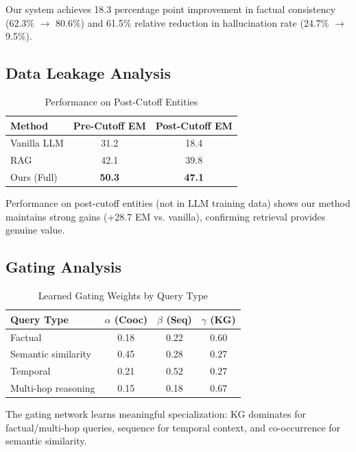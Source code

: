 \documentclass[conference]{IEEEtran}
\begin{document}
Our system achieves 18.3 percentage point improvement in factual consistency (62.3\% $\rightarrow$ 80.6\%) and 61.5\% relative reduction in hallucination rate (24.7\% $\rightarrow$ 9.5\%).

\subsection{Data Leakage Analysis}

\begin{table}[h]
\centering
\caption{Performance on Post-Cutoff Entities}
\label{tab:ablation_leakage}
\begin{tabular}{lcc}
\toprule
\textbf{Method} & \textbf{Pre-Cutoff EM} & \textbf{Post-Cutoff EM} \\
\midrule
Vanilla LLM & 31.2 & 18.4 \\
RAG & 42.1 & 39.8 \\
Ours (Full) & \textbf{50.3} & \textbf{47.1} \\
\bottomrule
\end{tabular}
\end{table}

Performance on post-cutoff entities (not in LLM training data) shows our method maintains strong gains (+28.7 EM vs. vanilla), confirming retrieval provides genuine value.

\subsection{Gating Analysis}

\begin{table}[h]
\centering
\caption{Learned Gating Weights by Query Type}
\label{tab:gating}
\begin{tabular}{lccc}
\toprule
\textbf{Query Type} & $\alpha$ (Cooc) & $\beta$ (Seq) & $\gamma$ (KG) \\
\midrule
Factual & 0.18 & 0.22 & 0.60 \\
Semantic similarity & 0.45 & 0.28 & 0.27 \\
Temporal & 0.21 & 0.52 & 0.27 \\
Multi-hop reasoning & 0.15 & 0.18 & 0.67 \\
\bottomrule
\end{tabular}
\end{table}

The gating network learns meaningful specialization: KG dominates for factual/multi-hop queries, sequence for temporal context, and co-occurrence for semantic similarity.
\end{document}
